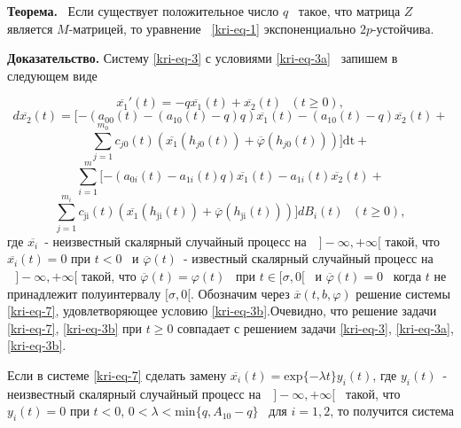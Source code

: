 \textbf{Теорема.} \ Если существует положительное число  $q$ \ такое, что матрица  $Z$ является  $M${}-матрицей, то
уравнение \ \eqref{kri-eq-1} экспоненциально  $2p${}-устойчива.

\textbf{Доказательство.} Систему \eqref{kri-eq-3} с условиями \eqref{kri-eq-3a} \ запишем в следующем виде

\begin{equation*}
	\overline{x_1}'(t)=-q\overline{x_1}(t)+\overline{x_2}(t)\text{   }(t\ge 0),
\end{equation*}
\begin{equation*}
	d\overline{x_2}(t)=[-(a_{00}(t)-(a_{10}(t)-q)q)\overline{x_1}(t)-(a_{10}(t)-q)\overline{x_2}(t)+
\end{equation*}
\begin{equation}\label{kri-eq-7}
	\overset{m_0}{\underset{j=1}{\sum }}c_{\mathit{j0}}(t)(\overline{x_1}(h_{\mathit{j0}}(t))+\overline{\varphi
	}(h_{\mathit{j0}}(t)))]\text{dt}+
\end{equation}
\begin{equation*}
	\overset m{\underset{i=1}{\sum
	}}[-(a_{0i}(t)-a_{1i}(t)q)\overline{x_1}(t)-a_{1i}(t)\overline{x_2}(t)+
\end{equation*}
\begin{equation*}
	\overset{m_i}{\underset{j=1}{\sum
	}}c_{\text{ji}}(t)(\overline{x_1}(h_{\text{ji}}(t))+\overline{\varphi
	}(h_{\text{ji}}(t)))]\mathit{dB}_i(t)\text{  }(t\ge 0),
\end{equation*}
где  $\overline{x_i}$\ {}- неизвестный скалярный случайный процесс на
$\text{  }]-\infty ,+\infty [$ такой, что  $\overline{x_i}(t)=0$ при
$t<0$ \ и  $\overline{\varphi }(t)$\ {}- известный скалярный случайный процесс на $\text{  }]-\infty ,+\infty
[$ такой, что  $\overline{\varphi }(t)=\varphi (t)$ \ при  $t\in [\sigma ,0[$ \ и  $\overline{\varphi
}(t)=0$ \ когда  $t$ не принадлежит полуинтервалу  $[\sigma ,0[$. Обозначим через
$\overline x(t,b,\varphi )$ решение системы \eqref{kri-eq-7}, удовлетворяющее условию \eqref{kri-eq-3b}.Очевидно, что
решение задачи \eqref{kri-eq-7}, \eqref{kri-eq-3b} при  $t\ge 0$ совпадает с решением задачи \eqref{kri-eq-3}, \eqref{kri-eq-3a}, \eqref{kri-eq-3b}.

Если в системе \eqref{kri-eq-7} сделать замену  $\overline{x_i}(t)=\text{exp}\{-\mathit{\lambda t}\}y_i(t)$, где  $y_i(t)$\ {}-
неизвестный скалярный случайный процесс на  $\text{  }]-\infty ,+\infty [$ \ такой, что $y_i(t)=0$ при  $t<0$,
$0<\lambda <\text{min}\{q,A_{10}-q\}$ \ для  $i=1,2$, то получится система


